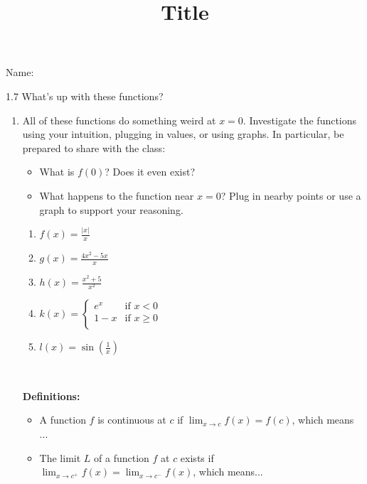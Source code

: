 \documentclass[12pt]{article}
\title{Title}
\begin{document}
 Name:
 \begin{center}\large{1.7 What's up with these functions?}\end{center}
\begin{enumerate}

\item All of these functions do something weird at $x=0$. Investigate the functions using your intuition, plugging in values, or using graphs. In particular, be prepared to share with the class:
	\begin{itemize}
	\item What is $f(0)$? Does it even exist?
	\item What happens to the function near $x=0$? Plug in nearby points or use a graph to support your reasoning.
	\end{itemize}
	
	\begin{enumerate}
	\item $\displaystyle f(x)=\frac{|x|}{x}$
	\vfill
	\item $\displaystyle g(x)=\frac{4x^2-5x}{x}$
	\vfill
	\item $\displaystyle h(x)=\frac{x^2+5}{x^2}$
	\vfill
	\item $\displaystyle k(x) = \begin{cases} 
      e^x& \text{if }x < 0 \\
      1-x & \text{if }x \geq 0 \\
   \end{cases}$
	\vfill
	\item $\displaystyle l(x)=\sin\left(\frac{1}{x}\right)$
	\vfill
	\end{enumerate}
\newpage
~
\begin{tcolorbox} 
\textbf{Definitions:}

\begin{itemize} 
\item A function $f$ is continuous at $c$ if $\displaystyle \lim_{x \to c} f(x) = f(c)$, which means ...

\vspace{30mm}

\item The limit $L$ of a function $f$ at $c$ exists if $\displaystyle \lim_{x \to c^+} f(x) =  \lim_{x \to c^-} f(x)$, which means...
 \vspace{25mm}

\end{itemize}
\end{tcolorbox}


\end{enumerate}
\end{document}
